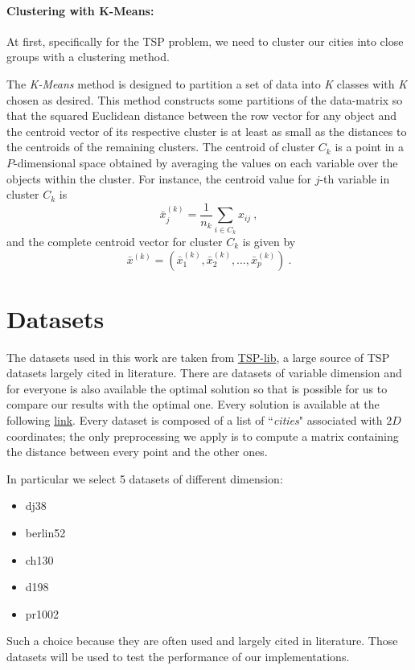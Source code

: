 \documentclass[10pt]{article}
\begin{document}
\paragraph{Clustering with K-Means:} 
At first, specifically for the TSP problem, we need to cluster our cities into close groups with a clustering method.

The \textit{K-Means} method is designed to partition a set of data into \textit{K} classes with \textit{K} chosen as desired.
This method constructs some partitions of the data-matrix so that the squared Euclidean distance between the row vector for any object and the centroid vector of its respective cluster is at least as small as the distances to the centroids of the remaining clusters.
The centroid of cluster $C_k$ is a point in a $P$-dimensional space obtained by averaging the values on each variable over the objects within the cluster. For instance, the centroid value for $j$-th variable in cluster $C_k$ is
\begin{equation}
\bar{x}_{j}^{(k)} = \frac{1}{n_k} \sum_{i \in C_k} x_{ij}~,
\end{equation}
and the complete centroid vector for cluster $C_k$ is given by \cite{ventidue}
\begin{equation}
\bar{x}^{(k)}  = (\bar{x}_1^{(k)},\bar{x}_2^{(k)},\dots,\bar{x}_p^{(k)})~.
\end{equation}

\section{Datasets} \label{sec:data}
The datasets used in this work are taken from  \href{https://wwwproxy.iwr.uni-heidelberg.de/groups/comopt/software/TSPLIB95/tsp/}{TSP-lib}, a large source of TSP datasets largely cited in literature. 
There are datasets of variable dimension and for everyone is also available the optimal solution so that is possible for us to compare our results with the optimal one. 
Every solution is available at the following \href{https://wwwproxy.iwr.uni-heidelberg.de/groups/comopt/software/TSPLIB95/STSP.html}{link}. 
Every dataset is composed of a list of ``\textit{cities}" associated with $2D$ coordinates; the only preprocessing we apply is to compute a matrix containing the distance between every point and the other ones.

In particular we select 5 datasets of different dimension:
\begin{itemize}[noitemsep]
\item dj38
\item berlin52
\item ch130
\item d198
\item pr1002
\end{itemize}
Such a choice because they are often used and largely cited in literature.
Those datasets will be used to test the performance of our implementations.
\vfill
\newpage
\end{document}
